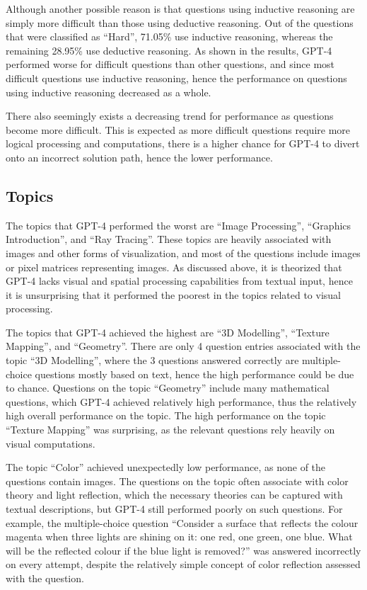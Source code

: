 \documentclass[sigconf,authordraft]{acmart}
\begin{document}
Although another possible reason is that questions using inductive reasoning are simply more difficult than those using deductive reasoning. Out of the questions that were classified as ``Hard'', 71.05\% use inductive reasoning, whereas the remaining 28.95\% use deductive reasoning. As shown in the results, GPT-4 performed worse for difficult questions than other questions, and since most difficult questions use inductive reasoning, hence the performance on questions using inductive reasoning decreased as a whole.

There also seemingly exists a decreasing trend for performance as questions become more difficult. This is expected as more difficult questions require more logical processing and computations, there is a higher chance for GPT-4 to divert onto an incorrect solution path, hence the lower performance.

\subsection{Topics}
The topics that GPT-4 performed the worst are ``Image Processing'', ``Graphics Introduction'', and ``Ray Tracing''. These topics are heavily associated with images and other forms of visualization, and most of the questions include images or pixel matrices representing images. As discussed above, it is theorized that GPT-4 lacks visual and spatial processing capabilities from textual input, hence it is unsurprising that it performed the poorest in the topics related to visual processing.

The topics that GPT-4 achieved the highest are ``3D Modelling'', ``Texture Mapping'', and ``Geometry''. There are only 4 question entries associated with the topic ``3D Modelling'', where the 3 questions answered correctly are multiple-choice questions mostly based on text, hence the high performance could be due to chance. Questions on the topic ``Geometry'' include many mathematical questions, which GPT-4 achieved relatively high performance, thus the relatively high overall performance on the topic. The high performance on the topic ``Texture Mapping'' was surprising, as the relevant questions rely heavily on visual computations.

The topic ``Color'' achieved unexpectedly low performance, as none of the questions contain images. The questions on the topic often associate with color theory and light reflection, which the necessary theories can be captured with textual descriptions, but GPT-4 still performed poorly on such questions. For example, the multiple-choice question ``Consider a surface that reflects the colour magenta when three lights are shining on it: one red, one green, one blue. What will be the reflected colour if the blue light is removed?'' was answered incorrectly on every attempt, despite the relatively simple concept of color reflection assessed with the question.
\end{document}
